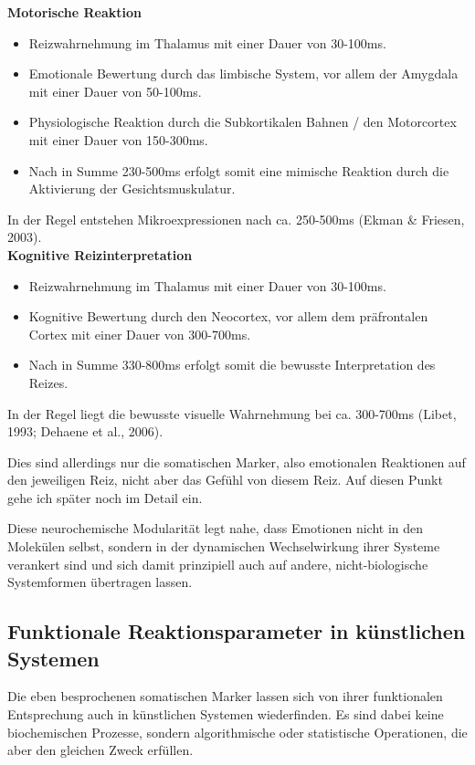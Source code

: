 \textbf{Motorische Reaktion}

\begin{itemize}
  \item Reizwahrnehmung im Thalamus mit einer Dauer von 30-100ms.
  \item Emotionale Bewertung durch das limbische System, vor allem der Amygdala mit einer Dauer von 50-100ms.
  \item Physiologische Reaktion durch die Subkortikalen Bahnen / den Motorcortex mit einer Dauer von 150-300ms.
  \item Nach in Summe 230-500ms erfolgt somit eine mimische Reaktion durch die Aktivierung der Gesichtsmuskulatur.
\end{itemize}
In der Regel entstehen Mikroexpressionen nach ca. 250-500ms (Ekman \& Friesen, 2003).\\

\textbf{Kognitive Reizinterpretation}

\begin{itemize}
  \item Reizwahrnehmung im Thalamus mit einer Dauer von 30-100ms.
  \item Kognitive Bewertung durch den Neocortex, vor allem dem präfrontalen Cortex mit einer Dauer von 300-700ms.
  \item Nach in Summe 330-800ms erfolgt somit die bewusste Interpretation des Reizes.
\end{itemize}
In der Regel liegt die bewusste visuelle Wahrnehmung bei ca. 300-700ms (Libet, 1993; Dehaene et al., 2006).

Dies sind allerdings nur die somatischen Marker, also emotionalen Reaktionen auf den jeweiligen Reiz, nicht aber das Gefühl von diesem Reiz. Auf diesen Punkt gehe ich später noch im Detail ein.

Diese neurochemische Modularität legt nahe, dass Emotionen nicht in den Molekülen selbst, sondern in der dynamischen Wechselwirkung ihrer Systeme verankert sind und sich damit prinzipiell auch auf andere, nicht-biologische Systemformen übertragen lassen.


\subsection*{Funktionale Reaktionsparameter in künstlichen Systemen}
Die eben besprochenen somatischen Marker lassen sich von ihrer funktionalen Entsprechung auch in künstlichen Systemen wiederfinden. Es sind dabei keine biochemischen Prozesse, sondern algorithmische oder statistische Operationen, die aber den gleichen Zweck erfüllen.

